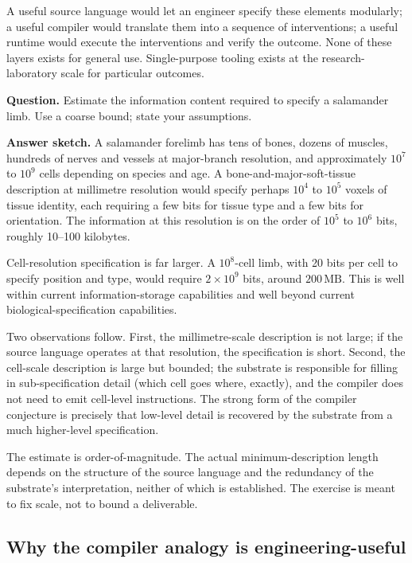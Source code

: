 A useful source language would let an engineer specify these elements
modularly; a useful compiler would translate them into a sequence of
interventions; a useful runtime would execute the interventions and
verify the outcome. None of these layers exists for general use.
Single-purpose tooling exists at the research-laboratory scale for
particular outcomes.

\begin{estimation}
\textbf{Question.} Estimate the information content required to
specify a salamander limb. Use a coarse bound; state your assumptions.

\textbf{Answer sketch.} A salamander forelimb has tens of bones,
dozens of muscles, hundreds of nerves and vessels at major-branch
resolution, and approximately $10^7$ to $10^9$ cells depending on
species and age. A bone-and-major-soft-tissue description at
millimetre resolution would specify perhaps $10^4$ to $10^5$ voxels of
tissue identity, each requiring a few bits for tissue type and a few
bits for orientation. The information at this resolution is on the
order of $10^5$ to $10^6$ bits, roughly 10--100 kilobytes.

Cell-resolution specification is far larger. A $10^8$-cell limb, with
20 bits per cell to specify position and type, would require $2\times
10^9$ bits, around $200\,\text{MB}$. This is well within current
information-storage capabilities and well beyond current
biological-specification capabilities.

Two observations follow. First, the millimetre-scale description is
not large; if the source language operates at that resolution, the
specification is short. Second, the cell-scale description is large
but bounded; the substrate is responsible for filling in
sub-specification detail (which cell goes where, exactly), and the
compiler does not need to emit cell-level instructions. The strong
form of the compiler conjecture is precisely that low-level detail is
recovered by the substrate from a much higher-level specification.

The estimate is order-of-magnitude. The actual minimum-description
length depends on the structure of the source language and the
redundancy of the substrate's interpretation, neither of which is
established. The exercise is meant to fix scale, not to bound a
deliverable.
\end{estimation}

\subsection{Why the compiler analogy is engineering-useful}

